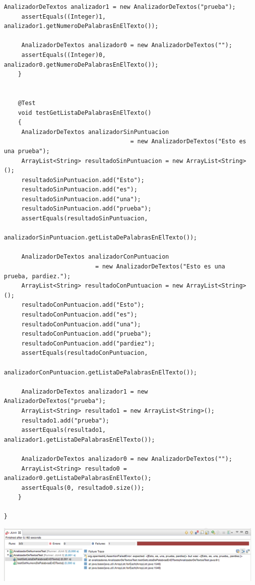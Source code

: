 \documentclass[spanish,12pt,a4paper,final,oneside]{book}
\begin{document}
\begin{lstlisting}[frame=single]
   	 AnalizadorDeTextos analizador1 = new AnalizadorDeTextos("prueba");
   	 assertEquals((Integer)1, analizador1.getNumeroDePalabrasEnElTexto());
   	 
   	 AnalizadorDeTextos analizador0 = new AnalizadorDeTextos("");
   	 assertEquals((Integer)0, analizador0.getNumeroDePalabrasEnElTexto());
    }


    @Test
    void testGetListaDePalabrasEnElTexto()
    {
   	 AnalizadorDeTextos analizadorSinPuntuacion 
                                    = new AnalizadorDeTextos("Esto es una prueba");
   	 ArrayList<String> resultadoSinPuntuacion = new ArrayList<String>();
   	 resultadoSinPuntuacion.add("Esto");
   	 resultadoSinPuntuacion.add("es");
   	 resultadoSinPuntuacion.add("una");
   	 resultadoSinPuntuacion.add("prueba");
   	 assertEquals(resultadoSinPuntuacion, 
                     analizadorSinPuntuacion.getListaDePalabrasEnElTexto());
   	 
   	 AnalizadorDeTextos analizadorConPuntuacion 
                          = new AnalizadorDeTextos("Esto es una prueba, pardiez.");
   	 ArrayList<String> resultadoConPuntuacion = new ArrayList<String>();
   	 resultadoConPuntuacion.add("Esto");
   	 resultadoConPuntuacion.add("es");
   	 resultadoConPuntuacion.add("una");
   	 resultadoConPuntuacion.add("prueba");
   	 resultadoConPuntuacion.add("pardiez");
   	 assertEquals(resultadoConPuntuacion, 
                     analizadorConPuntuacion.getListaDePalabrasEnElTexto());
   	 
   	 AnalizadorDeTextos analizador1 = new AnalizadorDeTextos("prueba");
   	 ArrayList<String> resultado1 = new ArrayList<String>();
   	 resultado1.add("prueba");
   	 assertEquals(resultado1, analizador1.getListaDePalabrasEnElTexto());
   	 
   	 AnalizadorDeTextos analizador0 = new AnalizadorDeTextos("");
   	 ArrayList<String> resultado0 = analizador0.getListaDePalabrasEnElTexto();
   	 assertEquals(0, resultado0.size());
    }

}
\end{lstlisting}

\includegraphics[width=\textwidth]{resultados de JUnit} 
\end{document}
